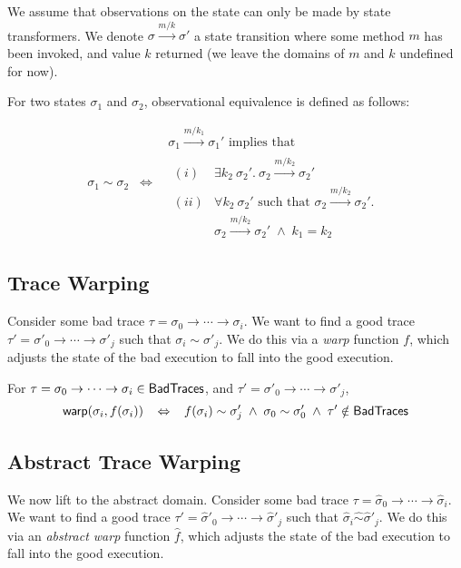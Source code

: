 We assume that observations on the state can only be made by state transformers. We denote
$\sigma \xrightarrow{m/k} \sigma'$ a state transition where some method $m$ has been invoked, and value $k$ returned (we leave the domains of $m$ and $k$ undefined for now).

For two states $\sigma_1$ and $\sigma_2$, observational equivalence is defined as follows:

$$\sigma_1 \sim \sigma_2 \;\;\Leftrightarrow\;\;
\begin{array}{l}
  \sigma_1 \xrightarrow{m/k_1} \sigma_1' \text{ implies that }\\
  \begin{array}{rl}
      (i)&\exists k_2\ \sigma_2'.\ \sigma_2  \xrightarrow{m/k_2} \sigma_2'\\
      (ii)&\forall k_2\ \sigma_2' \text{ such that } \sigma_2  \xrightarrow{m/k_2} \sigma_2'.\\
          & \sigma_2 \xrightarrow{m/k_2} \sigma_2' \;\wedge\; k_1 = k_2  
          \end{array}
\end{array}
$$

\subsection{Trace Warping}

\newcommand\warp{\textsf{warp}}
Consider some  bad trace $\tau = \sigma_0 \to \cdots \to \sigma_i$. We want to find a good trace $\tau' = \sigma'_0 \to \cdots \to \sigma'_j$ such that $\sigma_i \sim \sigma'_j$. We do this via a \emph{warp} function $f$, which adjusts the state of the bad execution to fall into the good execution. 

For $\tau = \sigma_0 \to \cdots \to \sigma_i \in \mathsf{BadTraces}$, 
and $\tau' = \sigma'_0 \to \cdots \to \sigma'_j$,
$$
\warp(\sigma_i,f(\sigma_i))
\;\;\;\Leftrightarrow\;\;\;
f(\sigma_i) \sim \sigma_j'
\;\wedge\;
\sigma_0 \sim \sigma'_0
\;\wedge\;
\tau' \notin \badtraces
$$



\subsection{Abstract Trace Warping}


\newcommand\awarp{\textsf{awarp}} We now lift to the abstract domain.  Consider some bad trace $\tau = \hat{\sigma}_0 \to \cdots \to \hat{\sigma}_i$. We want to find a good trace $\tau' = \hat{\sigma}'_0 \to \cdots \to \hat{\sigma}'_j$ such that $\hat{\sigma}_i \hat{\sim} \hat{\sigma}'_j$. We do this via an \emph{abstract warp} function $\hat{f}$, which adjusts the state of the bad execution to fall into the good execution.

